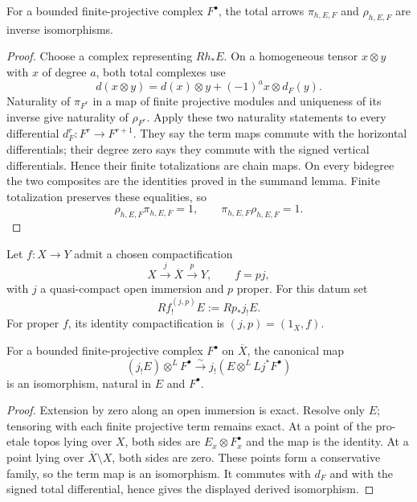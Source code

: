 \begin{lemma}
\label{lemma:weil-pbc-projection-formula-totalization}
For a bounded finite-projective complex $F^\bullet$, the total arrows
$\pi_{h,E,F}$ and $\rho_{h,E,F}$ are inverse isomorphisms.
\end{lemma}
\begin{proof}

Choose a complex representing $Rh_*E$.  On a homogeneous tensor
$x\otimes y$ with $x$ of degree $a$, both total complexes use
\[
 d(x\otimes y)=d(x)\otimes y+(-1)^a x\otimes d_F(y).
\]
Naturality of $\pi_{F^r}$ in a map of finite projective modules and uniqueness
of its inverse give naturality of $\rho_{F^r}$.  Apply these two naturality
statements to every differential $d_F^r:F^r\to F^{r+1}$.  They say the term
maps commute with the horizontal differentials; their degree zero says they
commute with the signed vertical differentials.  Hence their finite
totalizations are chain maps.  On every bidegree the two composites are the
identities proved in the summand lemma.  Finite totalization preserves these
equalities, so
\[
 \rho_{h,E,F}\pi_{h,E,F}=1,
 \qquad \pi_{h,E,F}\rho_{h,E,F}=1.
\]
\end{proof}

\begin{definition}
\label{def:weil-pbc-projection-compactification}
\uses{}
\leanok
Let $f:X\to Y$ admit a chosen compactification
\[
 X\xrightarrow{j}\overline X\xrightarrow{p}Y,
 \qquad f=pj,
\]
with $j$ a quasi-compact open immersion and $p$ proper.  For this datum set
\[
 Rf_!^{(j,p)}E:=Rp_*j_!E.
\]
For proper $f$, its identity compactification is $(j,p)=(1_X,f)$.
\end{definition}

\begin{lemma}
\label{lemma:weil-pbc-projection-formula-open-piece}
For a bounded finite-projective complex $F^\bullet$ on $\overline X$, the
canonical map
\[
 (j_!E)\otimes^LF^\bullet
 \xrightarrow{\sim}j_!(E\otimes^LLj^*F^\bullet)
\]
is an isomorphism, natural in $E$ and $F^\bullet$.
\end{lemma}
\begin{proof}
Extension by zero along an open immersion is exact.  Resolve only $E$;
tensoring with each finite projective term remains exact.  At a point of the
pro-etale topos lying over $X$, both sides are $E_x\otimes F_x^\bullet$ and
the map is the identity.  At a point lying over
$\overline X\setminus X$, both sides are zero.  These points form a
conservative family, so the term map is an isomorphism.  It commutes with
$d_F$ and with the signed total differential, hence gives the displayed
derived isomorphism.
\end{proof}

